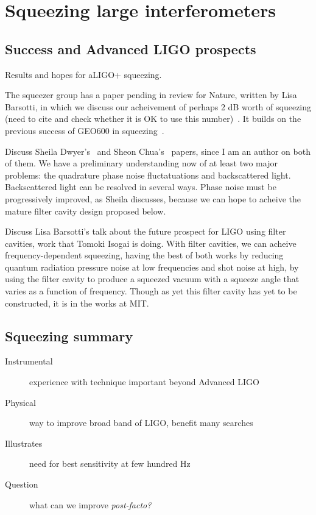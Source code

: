 \section{Squeezing large interferometers}

        \subsection{Success and Advanced LIGO prospects}
        \label{squeezing_success}
            Results and hopes for aLIGO+ squeezing.

	    The squeezer group has a paper pending in review for Nature, written by Lisa Barsotti, in which we discuss our acheivement of perhaps 2 dB worth of squeezing (need to cite and check whether it is OK to use this number)~\cite{BarsottiNatureSqueezing}. It builds on the previous success of GEO600 in squeezing~\cite{GEO600NatureSqueezing}.

	    Discuss Sheila Dwyer's~\cite{DwyerPhaseNoise} and Sheon Chua's~\cite{ChuaBackscatteredLight} papers, since I am an author on both of them. We have a preliminary understanding now of at least two major problems: the quadrature phase noise fluctatuations and backscattered light. Backscattered light can be resolved in several ways. Phase noise must be progressively improved, as Sheila discusses, because we can hope to acheive the mature filter cavity design proposed below.

Discuss Lisa Barsotti's talk about the future prospect for LIGO using filter cavities, work that Tomoki Isogai is doing. With filter cavities, we can acheive frequency-dependent squeezing, having the best of both works by reducing quantum radiation pressure noise at low frequencies and shot noise at high, by using the filter cavity to produce a squeezed vacuum with a squeeze angle that varies as a function of frequency. Though as yet this filter cavity has yet to be constructed, it is in the works at MIT.



\subsection{Squeezing summary}

\begin{description}
\item [{Instrumental}] experience with technique important beyond Advanced
LIGO
\item [{Physical}] way to improve broad band of LIGO, benefit many searches
\item [{Illustrates}] need for best sensitivity at few hundred Hz
\item [{Question}] what can we improve \emph{post-facto?}
\end{description}



